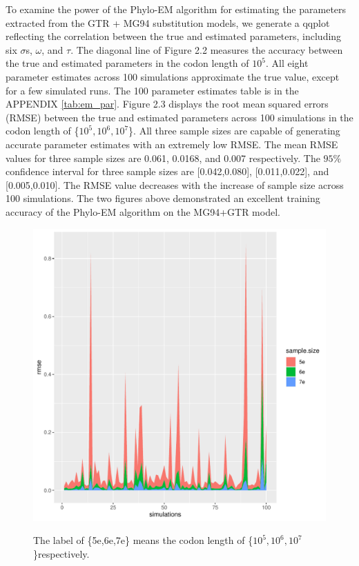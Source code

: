 To examine the power of the Phylo-EM algorithm for estimating the parameters extracted from the GTR + MG94 substitution models, we generate a qqplot reflecting the correlation between the true and estimated parameters, including six $\sigma$s, $\omega$, and $\tau$. The diagonal line of Figure 2.2 measures the accuracy between the true and estimated parameters in the codon length of $10^5$. All eight parameter estimates across 100 simulations approximate the true value, except for a few simulated runs. The 100 parameter estimates table is in the APPENDIX \ref{tab:em_par}.     
Figure 2.3 displays the root mean squared errors (RMSE) between the true and estimated parameters across 100 simulations in the codon length of \{$10^{5}, 10^{6}, 10^{7}$\}. All three sample sizes are capable of generating accurate parameter estimates with an extremely low RMSE. The mean RMSE values for three sample sizes are 0.061, 0.0168, and 0.007 respectively. The $95\%$ confidence interval for three sample sizes are [0.042,0.080], [0.011,0.022], and [0.005,0.010]. The RMSE value decreases with the increase of sample size across 100 simulations. The two figures above demonstrated an excellent training accuracy of the Phylo-EM algorithm on the MG94+GTR model.   
\begin{figure}[H]
     \begin{minipage}[t]{1\textwidth}
     \centering
     \includegraphics[width=\linewidth]{Fig3.pdf}
      {The label of {\{5e,6e,7e\} means the codon length of \{$10^{5}, 10^{6}, 10^{7}$\}respectively}.
      \par}
     \end{minipage}
\end{figure}


